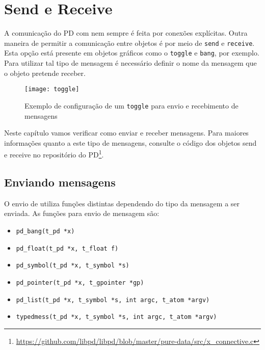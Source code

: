 \chapter{Send e Receive}

A comunicação do PD com \externals nem sempre é feita por conexões explícitas.
Outra maneira de permitir a comunicação entre objetos é por meio de \texttt{send} e
\texttt{receive}.
Esta opção está presente em objetos gráficos como o \texttt{toggle} e \texttt{bang}, por exemplo.
Para utilizar tal tipo de mensagem é necessário definir o nome da mensagem que
o objeto pretende receber.

\begin{figure}[h!]
\centering
\texttt{[image: toggle]}
\caption{Exemplo de configuração de um \texttt{toggle} para envio e recebimento de mensagens}
\end{figure}

Neste capítulo vamos verificar como enviar e receber mensagens.
Para maiores informações quanto a este tipo de mensagens, consulte o código dos
objetos send e receive no repositório do PD\footnote{
\url{https://github.com/libpd/libpd/blob/master/pure-data/src/x_connective.c}
}.

\section{Enviando mensagens}

O envio de utiliza funções distintas dependendo do tipo da mensagem a ser enviada.
As funções para envio de mensagem são:

\begin{itemize}
\item \texttt{pd\_bang(t\_pd *x)}
\item \texttt{pd\_float(t\_pd *x, t\_float f)}
\item \texttt{pd\_symbol(t\_pd *x, t\_symbol *s)}
\item \texttt{pd\_pointer(t\_pd *x, t\_gpointer *gp)}
\item \texttt{pd\_list(t\_pd *x, t\_symbol *s, int argc, t\_atom *argv)}
\item \texttt{typedmess(t\_pd *x, t\_symbol *s, int argc, t\_atom *argv)}
\end{itemize}

